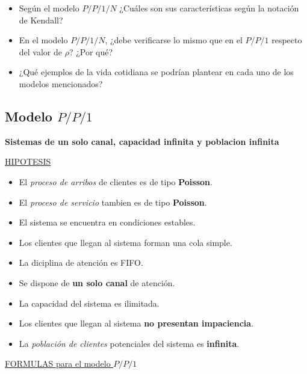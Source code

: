 \documentclass{article}
\begin{document}
\begin{itemize}
    \item Según el modelo \(P/P/1/N\) ¿Cuáles son sus características según la notación de Kendall?
    \item En el modelo \(P/P/1/N\), ¿debe verificarse lo mismo que en el \(P/P/1\) respecto del valor de \(\rho\)? ¿Por qué?
    \item ¿Qué ejemplos de la vida cotidiana se podrían plantear en cada uno de los modelos mencionados?
\end{itemize}

\subsection{Modelo \(P/P/1\)}
\textbf{Sistemas de un solo canal, capacidad infinita y poblacion infinita}

\noindent
\underline{HIPOTESIS}
\begin{itemize}
    \item El \textit{proceso de arribos} de clientes es de tipo \textbf{Poisson}.
    \item El \textit{proceso de servicio} tambien es de tipo \textbf{Poisson}.
    \item El sistema se encuentra en condiciones estables.
    \item Los clientes que llegan al sistema forman una cola simple.
    \item La diciplina de atención es FIFO.
    \item Se dispone de \textbf{un solo canal} de atención.
    \item La capacidad del sistema es ilimitada.
    \item Los clientes que llegan al sistema \textbf{no presentan impaciencia}.
    \item La \textit{población de clientes} potenciales del sistema es \textbf{infinita}.
\end{itemize}



\noindent
\underline{FORMULAS para el modelo \(P/P/1\)}
\end{document}
